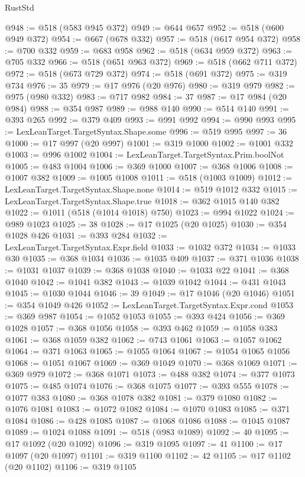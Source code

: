 \begin{lexlean}{RustStd}
\begin{coremodule}
{\begin{coremodule}
{{{{{{{{{{{{{{{{{{{{{{{{{{{{{{{{{{{{{{{{{{{{{{{{{{@948 := @518 (@583 @945 @372)
@949 := @644 @657
@952 := @518 (@600 @949 @372)
@954 := @667 (@678 @332)
@957 := @518 (@617 @954 @372)
@958 := @700 @332
@959 := @683 @958
@962 := @518 (@634 @959 @372)
@963 := @705 @332
@966 := @518 (@651 @963 @372)
@969 := @518 (@662 @711 @372)
@972 := @518 (@673 @729 @372)
@974 := @518 (@691 @372)
@975 := @319 @734
@976 := 35
@979 := @17 @976 (@20 @976)
@980 := @319 @979
@982 := @975 (@980 @332)
@983 := @717 @982
@984 := 37
@987 := @17 @984 (@20 @984)
@988 := @354 @987
@989 := @988 @140
@990 := @514 @140
@991 := @393 @265
@992 := @379 @409
@993 := @991 @992
@994 := @990 @993
@995 := LexLeanTarget.TargetSyntax.Shape.some
@996 := @519 @995
@997 := 36
@1000 := @17 @997 (@20 @997)
@1001 := @319 @1000
@1002 := @1001 @332
@1003 := @996 @1002
@1004 := LexLeanTarget.TargetSyntax.Prim.boolNot
@1005 := @483 @1004
@1006 := @369 @1000
@1007 := @368 @1006
@1008 := @1007 @382
@1009 := @1005 @1008
@1011 := @518 (@1003 @1009)
@1012 := LexLeanTarget.TargetSyntax.Shape.none
@1014 := @519 @1012 @332
@1015 := LexLeanTarget.TargetSyntax.Shape.true
@1018 := @362 @1015 @140 @382
@1022 := @1011 (@518 (@1014 @1018) @750)
@1023 := @994 @1022
@1024 := @989 @1023
@1025 := 38
@1028 := @17 @1025 (@20 @1025)
@1030 := @354 @1028 @426
@1031 := @393 @284
@1032 := LexLeanTarget.TargetSyntax.Expr.field
@1033 := @1032 @372
@1034 := @1033 @30
@1035 := @368 @1034
@1036 := @1035 @409
@1037 := @371 @1036
@1038 := @1031 @1037
@1039 := @368 @1038
@1040 := @1033 @22
@1041 := @368 @1040
@1042 := @1041 @382
@1043 := @1039 @1042
@1044 := @431 @1043
@1045 := @1030 @1044
@1046 := 39
@1049 := @17 @1046 (@20 @1046)
@1051 := @354 @1049 @426
@1052 := LexLeanTarget.TargetSyntax.Expr.cond
@1053 := @369 @987
@1054 := @1052 @1053
@1055 := @393 @424
@1056 := @369 @1028
@1057 := @368 @1056
@1058 := @393 @462
@1059 := @1058 @383
@1061 := @368 @1059 @382
@1062 := @743 @1061
@1063 := @1057 @1062
@1064 := @371 @1063
@1065 := @1055 @1064
@1067 := @1054 @1065 @1056
@1068 := @1051 @1067
@1069 := @369 @1049
@1070 := @368 @1069
@1071 := @369 @979
@1072 := @368 @1071
@1073 := @488 @382
@1074 := @377 @1073
@1075 := @485 @1074
@1076 := @368 @1075
@1077 := @393 @555
@1078 := @1077 @383
@1080 := @368 @1078 @382
@1081 := @379 @1080
@1082 := @1076 @1081
@1083 := @1072 @1082
@1084 := @1070 @1083
@1085 := @371 @1084
@1086 := @428 @1085
@1087 := @1068 @1086
@1088 := @1045 @1087
@1089 := @1024 @1088
@1091 := @518 (@983 @1089)
@1092 := 40
@1095 := @17 @1092 (@20 @1092)
@1096 := @319 @1095
@1097 := 41
@1100 := @17 @1097 (@20 @1097)
@1101 := @319 @1100
@1102 := 42
@1105 := @17 @1102 (@20 @1102)
@1106 := @319 @1105
}}}}}}}}}}}}}}}}}}}}}}}}}}}}}}}}}}}}}}}}}}}}}}}}}}
\end{coremodule}}
\end{coremodule}
\end{lexlean}
